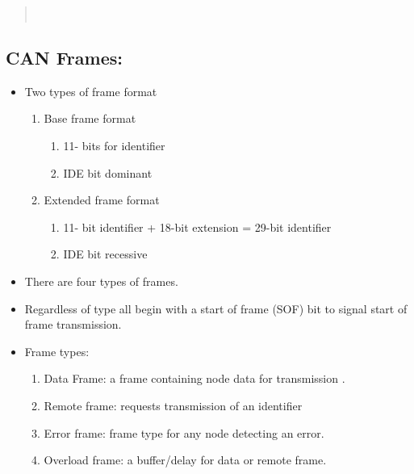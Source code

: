 \begin{quote}
~
\end{quote}

\subsection{CAN Frames:}

\begin{itemize}
\item
  Two types of frame format

  \begin{enumerate}
  \def\labelenumi{\arabic{enumi}.}
  \item
    Base frame format

    \begin{enumerate}
    \def\labelenumii{\roman{enumii}.}
    \item
      11- bits for identifier
    \item
      IDE bit dominant
    \end{enumerate}
  \item
    Extended frame format

    \begin{enumerate}
    \def\labelenumii{\roman{enumii}.}
    \item
      11- bit identifier + 18-bit extension = 29-bit identifier
    \item
      IDE bit recessive
    \end{enumerate}
  \end{enumerate}
\item
  There are four types of frames.
\item
  Regardless of type all begin with a start of frame (SOF) bit to signal
  start of frame transmission.
\item
  Frame types:

  \begin{enumerate}
  \def\labelenumi{\arabic{enumi}.}
  \item
    Data Frame: a frame containing node data for transmission
    .

  \item
    Remote frame: requests transmission of an identifier
  \item
    Error frame: frame type for any node detecting an error.
  \item
    Overload frame: a buffer/delay for data or remote frame.
  \end{enumerate}
\end{itemize}
